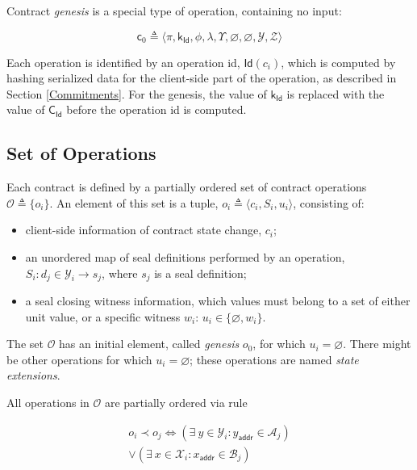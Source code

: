 \documentclass[a4paper]{article}
\begin{document}
\begin{multicols}{2}

Contract \emph{genesis} is a special type of operation, containing no input:

\begin{equation}
\mathsf{c}_0 \triangleq \langle \pi, \mathsf{k_{Id}}, \phi, \lambda, \Upsilon, \varnothing, \varnothing, \mathcal{Y}, \mathcal{Z} \rangle
\end{equation}

Each operation is identified by an operation id, $\mathsf{Id}(c_i)$, which is computed by
hashing serialized data for the client-side part of the operation,
as described in Section \ref{Commitments}. For the genesis, the value of $\mathsf{k_{Id}}$
is replaced with the value of $\mathsf{C_{Id}}$ before the operation id is computed.

\subsection{Set of Operations}

Each contract is defined by a partially ordered set of contract operations 
$\mathcal{O} \triangleq \{ o_i \}$.
An element of this set is a tuple, $o_i \triangleq \langle c_i, S_i, u_i \rangle$, consisting of:
\begin{itemize}
\item client-side information of contract state change, $c_i$;
\item an unordered map of seal definitions performed by an operation, 
  $S_i: d_j \in \mathcal{Y}_i \rightarrow s_j$, where $s_j$ is a seal definition;
\item a seal closing witness information, 
  which values must belong to a set of either unit value, or a specific witness $w_i$: 
  $u_i \in \{ \varnothing, w_i \}$.
\end{itemize}

The set $\mathcal{O}$ has an initial element, called \emph{genesis} $o_0$, for which $u_i = \varnothing$.
There might be other operations for which $u_i = \varnothing$;
these operations are named \emph{state extensions}.

All operations in $\mathcal{O}$ are partially ordered via rule

\begin{equation}
\begin{split}
o_i \prec o_j \Longleftrightarrow (\exists \ y \in \mathcal{Y}_i: y_\mathsf{addr} \in \mathcal{A}_j) \\
\vee (\exists \ x \in \mathcal{X}_i: x_\mathsf{addr} \in \mathcal{B}_j)
\end{split}
\end{equation}


\end{multicols}
\end{document}
